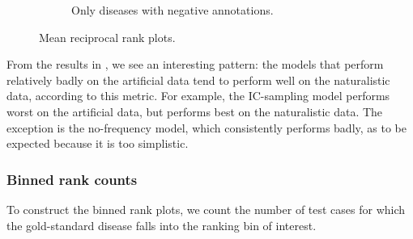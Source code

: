 \begin{figure}[h]
    \begin{subfigure}{0.99\textwidth} \centering
    \caption{Only diseases with negative annotations.}
    \label{fig:mrrneg}
    \end{subfigure}
    \caption{Mean reciprocal rank plots.}
    \label{fig:mrr}
\end{figure}

From the results in , we see an interesting pattern:
the models that perform relatively badly on the artificial data tend to perform well 
on the naturalistic data, according to this metric.
%
For example, the IC-sampling model performs worst on the artificial data, but performs
best on the naturalistic data.
%
The exception is the no-frequency model, which consistently performs badly, 
as to be expected because it is too simplistic.

\subsubsection{Binned rank counts}
\label{subsubsec:metricbrc}
%
To construct the binned rank plots,
we count the number of test cases for which the gold-standard disease falls into the
ranking bin of interest.

